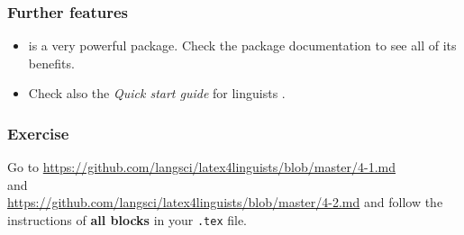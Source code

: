 \begin{frame}[fragile]
\frametitle{Further features}

\begin{itemize}
\item {} is a very powerful package. Check the package documentation \citep{Zivanovic17a} to see all of its benefits.

\item Check also the \emph{Quick start guide} for linguists \citep{VandenWyngaerd16a}.
\end{itemize}

\end{frame}


\begin{frame}[fragile]
\frametitle{Exercise}


Go to \url{https://github.com/langsci/latex4linguists/blob/master/4-1.md}\\
and\\
\url{https://github.com/langsci/latex4linguists/blob/master/4-2.md}
and follow the instructions of \textbf{all blocks} in your \texttt{.tex} file.


\end{frame}


%
%
%


%
%	
%
%
%
